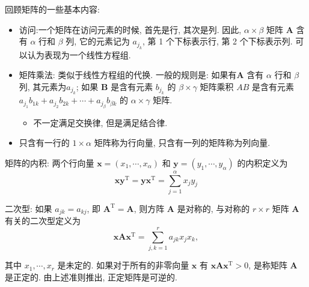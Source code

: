   \begin{asidebox}
    回顾矩阵的一些基本内容:   
    \begin{itemize}
      \item 访问:一个矩阵在访问元素的时候, 首先是行, 其次是列. 因此, $\alpha \times \beta$ 矩阵 $\boldsymbol{A}$ 含有 $\alpha$ 行和 $\beta$ 列, 它的元素记为 $a_{j_k}$, 第 1 个下标表示行, 第 2 个下标表示列. 可以认为表现为一个线性方程组.
      \item 矩阵乘法: 类似于线性方程组的代换. 一般的规则是: 如果有$\boldsymbol{A}$ 含有 $\alpha$ 行和 $\beta$ 列, 其元素为$a_{j_k}$; 如果 $\boldsymbol{B}$ 是含有元素 $b_{j_k}$ 的 $\beta \times \gamma$ 矩阵乘积 $A B$ 是含有元素 $a_{j_1} b_{1 k}+a_{j_2} b_{2 k}+\cdots+a_{j_\beta} b_{\beta k}$ 的 $\alpha \times \gamma$ 矩阵.
      \begin{itemize}
        \item 不一定满足交换律, 但是满足结合律. 
      \end{itemize}
      \item 只含有一行的 $1 \times \alpha$ 矩阵称为行向量, 只含有一列的矩阵称为列向量.
    \end{itemize}
    矩阵的内积: 两个行向量 $\boldsymbol{x}=\left(x_1, \cdots, x_\alpha\right)$ 和 $\boldsymbol{y}=\left(y_1, \cdots, y_\alpha\right)$ 的内积定义为
    $$\boldsymbol{x} \boldsymbol{y}^{\mathrm{T}}=\boldsymbol{y} \boldsymbol{x}^{\mathrm{T}}=\sum_{j=1}^\alpha x_j y_j$$

    二次型: 如果 $a_{j k}=a_{k j}$, 即 $\boldsymbol{A}^{\mathrm{T}}=\boldsymbol{A}$, 则方阵 $\boldsymbol{A}$ 是对称的, 与对称的 $r \times r$ 矩阵 $\boldsymbol{A}$ 有关的二次型定义为
$$
\boldsymbol{x} \boldsymbol{A} \boldsymbol{x}^{\mathrm{T}}=\sum_{j, k=1}^r a_{j k} x_j x_k,
$$

其中 $x_1, \cdots, x_r$ 是未定的. 如果对于所有的非零向量 $\boldsymbol{x}$ 有 $\boldsymbol{x} \boldsymbol{A} \boldsymbol{x}^{\mathrm{T}}>0$, 是称矩阵 $\boldsymbol{A}$ 是正定的. 由上述准则推出, 正定矩阵是可逆的.
    
  \end{asidebox}


